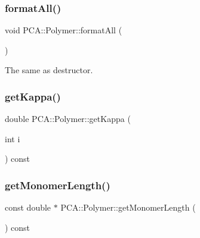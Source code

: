 \hypertarget{class_p_c_a_1_1_polymer_a3fcca4084a54ac8bc1941b36462bc560}{}\label{class_p_c_a_1_1_polymer_a3fcca4084a54ac8bc1941b36462bc560} 
\subsubsection{\texorpdfstring{format\+All()}{formatAll()}}
{\footnotesize\ttfamily void P\+C\+A\+::\+Polymer\+::format\+All (\begin{DoxyParamCaption}{ }\end{DoxyParamCaption})\hspace{0.3cm}{\ttfamily [protected]}}



The same as destructor. 

\hypertarget{class_p_c_a_1_1_polymer_ac0cafb89b662aaa3be2bbc7bf034d410}{}\label{class_p_c_a_1_1_polymer_ac0cafb89b662aaa3be2bbc7bf034d410} 
\subsubsection{\texorpdfstring{get\+Kappa()}{getKappa()}}
{\footnotesize\ttfamily double P\+C\+A\+::\+Polymer\+::get\+Kappa (\begin{DoxyParamCaption}\item[{int}]{i }\end{DoxyParamCaption}) const\hspace{0.3cm}{\ttfamily [inline]}}

\hypertarget{class_p_c_a_1_1_polymer_af05e598bcd1e9987aca46d0661ac6dca}{}\label{class_p_c_a_1_1_polymer_af05e598bcd1e9987aca46d0661ac6dca} 
\subsubsection{\texorpdfstring{get\+Monomer\+Length()}{getMonomerLength()}}
{\footnotesize\ttfamily const double $\ast$ P\+C\+A\+::\+Polymer\+::get\+Monomer\+Length (\begin{DoxyParamCaption}{ }\end{DoxyParamCaption}) const}

